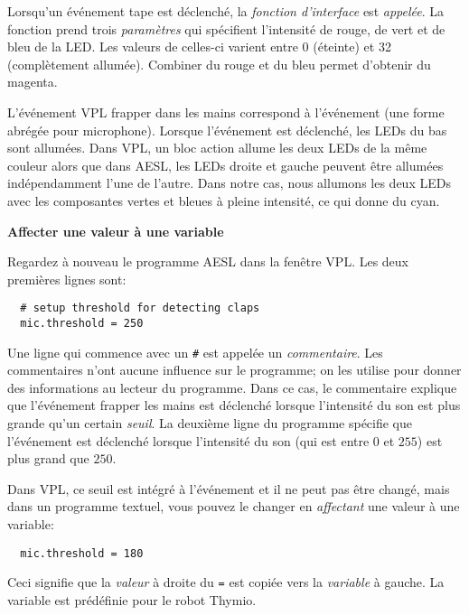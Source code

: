 Lorsqu'un événement tape est déclenché, la \emph{fonction d'interface}  est \emph{appelée}.
La fonction prend trois \emph{paramètres} qui spécifient l'intensité de rouge, de vert et de bleu de la LED.
Les valeurs de celles-ci varient entre 0 (éteinte) et 32 (complètement allumée).
Combiner du rouge et du bleu permet d'obtenir du magenta.

L'événement VPL frapper dans les mains correspond à l'événement  (une forme abrégée pour 
microphone).
Lorsque l'événement est déclenché, les LEDs du bas sont allumées.
Dans VPL, un bloc action allume les deux LEDs de la même couleur
alors que dans AESL, les LEDs droite et gauche peuvent être allumées indépendamment l'une de l'autre.
Dans notre cas, nous allumons les deux LEDs avec les composantes vertes et bleues à pleine intensité,
ce qui donne du cyan.

\textbf{\large Affecter une valeur à une variable}

Regardez à nouveau le programme AESL dans la fenêtre VPL.
Les deux premières lignes sont:

\begin{footnotesize}
\begin{verbatim}
  # setup threshold for detecting claps
  mic.threshold = 250
\end{verbatim}
\end{footnotesize}

Une ligne qui commence avec un \verb+#+ est appelée un \emph{commentaire}.
Les commentaires n'ont aucune influence sur le programme;
on les utilise pour donner des informations au lecteur du programme.
Dans ce cas, le commentaire explique que l'événement frapper les mains 
est déclenché lorsque l'intensité du son est plus grande qu'un certain
\emph{seuil}.
La deuxième ligne du programme spécifie que l'événement est déclenché lorsque l'intensité du son
(qui est entre $0$ et $255$) est plus grand que $250$.

Dans VPL, ce seuil est intégré à l'événement et il ne peut pas être changé,
mais dans un programme textuel, vous pouvez le changer en \emph{affectant} une valeur à une variable:

\begin{footnotesize}
\begin{verbatim}
  mic.threshold = 180
\end{verbatim}
\end{footnotesize}

Ceci signifie que la \emph{valeur} à droite du \verb+=+ est copiée vers la \emph{variable}
à gauche.
La variable  est prédéfinie pour le robot Thymio.

